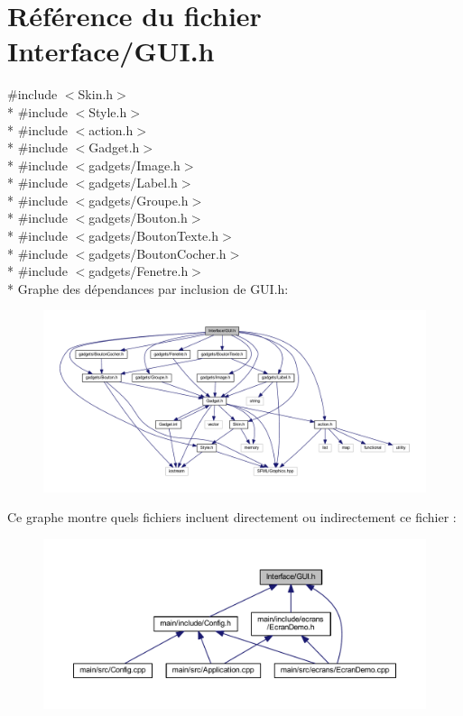 \section{Référence du fichier Interface/\+G\+U\+I.h}
\label{_g_u_i_8h}
{\ttfamily \#include $<$Skin.\+h$>$}\\*
{\ttfamily \#include $<$Style.\+h$>$}\\*
{\ttfamily \#include $<$action.\+h$>$}\\*
{\ttfamily \#include $<$Gadget.\+h$>$}\\*
{\ttfamily \#include $<$gadgets/\+Image.\+h$>$}\\*
{\ttfamily \#include $<$gadgets/\+Label.\+h$>$}\\*
{\ttfamily \#include $<$gadgets/\+Groupe.\+h$>$}\\*
{\ttfamily \#include $<$gadgets/\+Bouton.\+h$>$}\\*
{\ttfamily \#include $<$gadgets/\+Bouton\+Texte.\+h$>$}\\*
{\ttfamily \#include $<$gadgets/\+Bouton\+Cocher.\+h$>$}\\*
{\ttfamily \#include $<$gadgets/\+Fenetre.\+h$>$}\\*
Graphe des dépendances par inclusion de G\+U\+I.\+h\+:\nopagebreak
\begin{figure}[H]
\begin{center}
\leavevmode
\includegraphics[width=350pt]{_g_u_i_8h__incl}
\end{center}
\end{figure}
Ce graphe montre quels fichiers incluent directement ou indirectement ce fichier \+:\nopagebreak
\begin{figure}[H]
\begin{center}
\leavevmode
\includegraphics[width=350pt]{_g_u_i_8h__dep__incl}
\end{center}
\end{figure}
